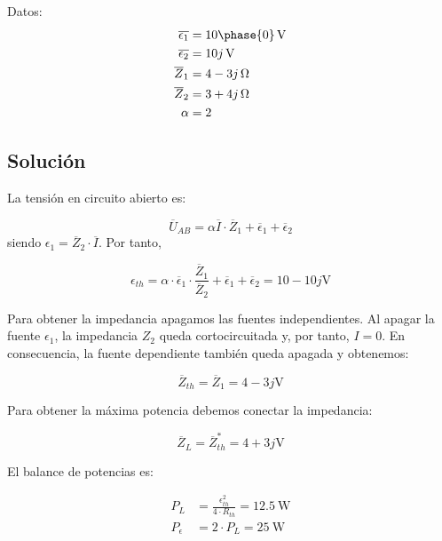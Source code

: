 \documentclass[12pt]{article}
\begin{document}
Datos:
\begin{align*}
  \overline{\epsilon_1} &= \SI[parse-numbers=false]{10\phase{0}}{\volt}\\
  \overline{\epsilon_2} &= \SI[parse-numbers=false]{10j}{\volt}\\
  \overline{Z}_1 &= \SI[parse-numbers=false]{4 - 3j}{\ohm}\\
  \overline{Z}_2 &= \SI[parse-numbers=false]{3 + 4j}{\ohm}\\
  \alpha &= 2
\end{align*}

\noindent\hrulefill

\subsection*{Solución}

La tensión en circuito abierto es:

\begin{equation*}
  \overline{U}_{AB} = \alpha \overline{I} \cdot \overline{Z}_1 + \overline{\epsilon}_1 + \overline{\epsilon}_2
\end{equation*}
siendo $\epsilon_1 = \overline{Z}_2 \cdot \overline{I}$. Por tanto,

\begin{equation*}
  \epsilon_{th} = \alpha \cdot \overline{\epsilon}_1 \cdot \frac{\overline{Z}_1}{\overline{Z}_2} + \overline{\epsilon}_1 + \overline{\epsilon}_2 = 10 - 10j \si{\volt}
\end{equation*}

Para obtener la impedancia apagamos las fuentes independientes. Al apagar la fuente $\epsilon_1$, la impedancia $Z_2$ queda cortocircuitada y, por tanto, $I = 0$. En consecuencia, la fuente dependiente también queda apagada y obtenemos:

\begin{equation*}
  \overline{Z}_{th} = \overline{Z}_1 = 4 - 3j \si{\volt}
\end{equation*}

Para obtener la máxima potencia debemos conectar la impedancia:

\begin{equation*}
  \overline{Z}_{L} = \overline{Z}^*_{th} = 4 + 3j \si{\volt}
\end{equation*}

El balance de potencias es:

\begin{align*}
  P_L &= \frac{\epsilon_{th}^2}{4 \cdot R_{th}} = \SI{12.5}{\watt}\\
  P_{\epsilon} &= 2 \cdot P_L = \SI{25}{\watt} 
\end{align*}
\end{document}
